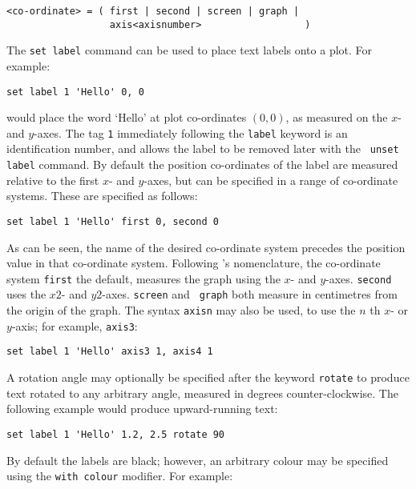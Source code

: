 \begin{verbatim}
<co-ordinate> = ( first | second | screen | graph |
                  axis<axisnumber>                  )
\end{verbatim}

The {\tt set label} command can be used to place text labels onto a plot.  For
example:

\begin{verbatim}
set label 1 'Hello' 0, 0
\end{verbatim}

\noindent would place the word `Hello' at plot co-ordinates $(0,0)$, as measured on the $x$-
and $y$-axes.  The tag {\tt 1} immediately following the {\tt label} keyword is an
identification number, and allows the label to be removed later with the {\tt
unset label} command.  By default the position co-ordinates of the label are
measured relative to the first $x$- and $y$-axes, but can be specified in a
range of co-ordinate systems. These are specified as follows:

\begin{verbatim}
set label 1 'Hello' first 0, second 0
\end{verbatim}

As can be seen, the name of the desired co-ordinate system precedes the position
value in that co-ordinate system. Following \gnuplot's nomenclature, the
co-ordinate system {\tt first} the default, measures the graph using the $x$- and
$y$-axes. {\tt second} uses the $x2$- and $y2$-axes.  {\tt screen} and {\tt
graph} both measure in centimetres from the origin of the graph.  The syntax
{\tt axisn} may also be used, to use the $n$ th $x$- or $y$-axis; for example,
{\tt axis3}:

\begin{verbatim}
set label 1 'Hello' axis3 1, axis4 1
\end{verbatim}

A rotation angle may optionally be specified after the keyword {\tt rotate}
to produce text rotated to any arbitrary angle, measured in degrees
counter-clockwise. The following example would produce upward-running text:

\begin{verbatim}
set label 1 'Hello' 1.2, 2.5 rotate 90
\end{verbatim}

By default the labels are black; however, an arbitrary colour may be specified
using the {\tt with colour} modifier.  For example:


